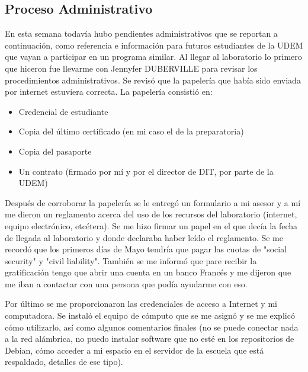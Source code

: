 \subsection{Proceso Administrativo}
En esta semana todavía hubo pendientes administrativos que se reportan a continuación, como referencia e información para futuros estudiantes de la UDEM que vayan a participar en un programa similar. Al llegar al laboratorio lo primero que hiceron fue llevarme con Jennyfer DUBERVILLE para revisar los procedimientos administrativos. Se revisó que la papelería que había sido enviada por internet estuviera correcta. La papelería consistió en:
\begin{itemize}
	\item Credencial de estudiante
	\item Copia del último certificado (en mi caso el de la preparatoria)
	\item Copia del pasaporte
	\item Un contrato (firmado por mí y por el director de DIT, por parte de la UDEM)
\end{itemize}
Después de corroborar la papelería se le entregó un formulario a mi asesor y a mí me dieron un reglamento acerca del uso de los recursos del laboratorio (internet, equipo electrónico, etcétera). Se me hizo firmar un papel en el que decía la fecha de llegada al laboratorio y donde declaraba haber leído el reglamento. Se me recordó que los primeros días de Mayo tendría que pagar las cuotas de "social security" y "civil liability". También se me informó que pare recibir la gratificación tengo que abrir una cuenta en un banco Francés y me dijeron que me iban a contactar con una persona que podía ayudarme con eso.

Por último se me proporcionaron las credenciales de acceso a Internet y mi computadora. Se instaló el equipo de cómputo que se me asignó y se me explicó cómo utilizarlo, así como algunos comentarios finales (no se puede conectar nada a la red alámbrica, no puedo instalar software que no esté en los repositorios de Debian, cómo acceder a mi espacio en el servidor de la escuela que está respaldado, detalles de ese tipo).

